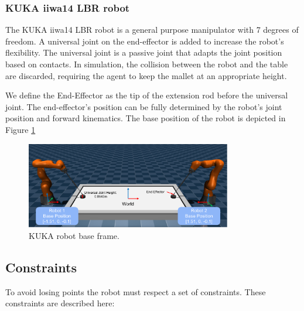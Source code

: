     \subsubsection{KUKA iiwa14 LBR robot}
    The KUKA iiwa14 LBR robot is a general purpose manipulator with 7 degrees of freedom. A universal joint on the end-effector is added
    to increase the robot's flexibility. The universal joint is a passive joint that adapts the joint position based on contacts. In simulation, the collision between the robot and the table
    are discarded, requiring the agent to keep the mallet at an appropriate height.

    We define the End-Effector as the tip of the extension rod before the universal joint. 
    The end-effector's position can be fully determined by the robot's joint position and forward kinematics. 
    The base position of the robot is depicted in Figure \ref{fig:kuka_env}

    \begin{figure}[h]
        \centering
        \includegraphics[width=0.8\textwidth]{Images/kuka_env.png}
        \caption{KUKA robot base frame.}
        \label{fig:kuka_env}
    \end{figure}

\subsection{Constraints}
To avoid losing points the robot must respect a set of constraints.
These constraints are described here:

